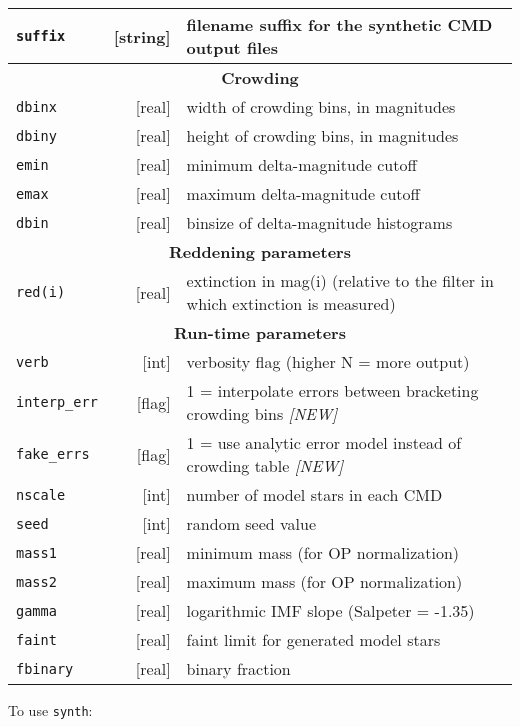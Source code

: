 \documentclass[12pt]{book}
\def\ttg{\tt\color{DarkGreen}}
\def\tto{\tt\color{myOrange}}
\def\itr{\it\color{myRed}}
\begin{document}
{\begin{tabular}{|lr|l|}
{\tto suffix} &[string]& filename suffix for the synthetic CMD output files\\ 
\hline
\multicolumn{3}{|c|}{\bf Crowding} \\ 
\hline
{\tto dbinx} & [real] & width of crowding bins, in magnitudes\\
{\tto dbiny} & [real] & height of crowding bins, in magnitudes\\
{\tto emin}  & [real] & minimum delta-magnitude cutoff\\
{\tto emax}  & [real] & maximum delta-magnitude cutoff\\
{\tto dbin}  & [real] & binsize of delta-magnitude histograms\\ 
\hline
\multicolumn{3}{|c|}{\bf Reddening parameters} \\ 
\hline
{\tto red(i)} & [real] & extinction in mag(i) (relative to the filter in which extinction is measured) \\ 
\hline
\multicolumn{3}{|c|}{\bf Run-time parameters} \\ 
\hline
{\tto verb}        &  [int] & verbosity flag (higher N = more output)\\
{\tto interp\_err} & [flag]\footnotemark[2] & 1 = interpolate errors between bracketing crowding bins {\itr[NEW]}\\
{\tto fake\_errs}  & [flag]\footnotemark[2] & 1 = use analytic error model instead of crowding table {\itr[NEW]}\\
{\tto nscale}      &  [int] & number of model stars in each CMD\\
{\tto seed}        &  [int] & random seed value\\
{\tto mass1}       & [real] & minimum mass (for OP normalization)\\
{\tto mass2}       & [real] & maximum mass (for OP normalization)\\
{\tto gamma}       & [real] & logarithmic IMF slope (Salpeter = -1.35)\\
{\tto faint}       & [real] & faint limit for generated model stars\\
{\tto fbinary}     & [real] & binary fraction\\ 
\hline
\end{tabular}
}

\clearpage
\noindent To use {\ttg synth}:
\end{document}
